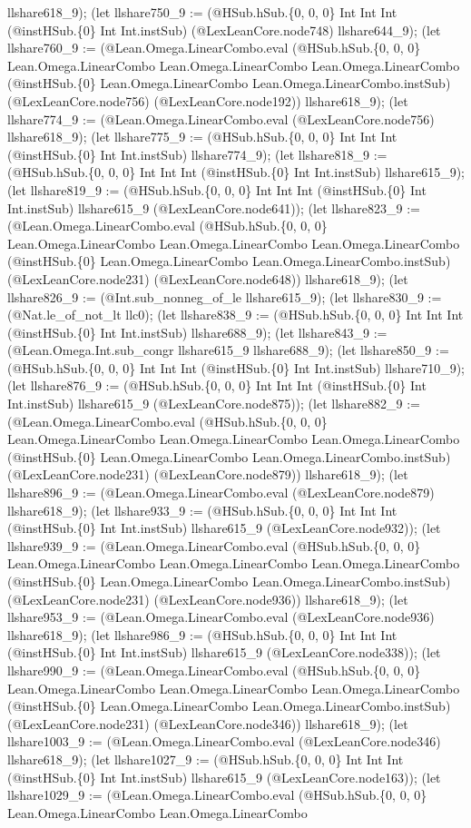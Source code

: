 \documentclass[11pt]{article}
\begin{document}
llshare618\_9); (let llshare750\_9 := (@HSub.hSub.\{0, 0, 0\} Int Int Int (@instHSub.\{0\} Int Int.instSub) (@LexLeanCore.node748) llshare644\_9); (let llshare760\_9 := (@Lean.Omega.LinearCombo.eval (@HSub.hSub.\{0, 0, 0\} Lean.Omega.LinearCombo Lean.Omega.LinearCombo Lean.Omega.LinearCombo (@instHSub.\{0\} Lean.Omega.LinearCombo Lean.Omega.LinearCombo.instSub) (@LexLeanCore.node756) (@LexLeanCore.node192)) llshare618\_9); (let llshare774\_9 := (@Lean.Omega.LinearCombo.eval (@LexLeanCore.node756) llshare618\_9); (let llshare775\_9 := (@HSub.hSub.\{0, 0, 0\} Int Int Int (@instHSub.\{0\} Int Int.instSub) llshare774\_9); (let llshare818\_9 := (@HSub.hSub.\{0, 0, 0\} Int Int Int (@instHSub.\{0\} Int Int.instSub) llshare615\_9); (let llshare819\_9 := (@HSub.hSub.\{0, 0, 0\} Int Int Int (@instHSub.\{0\} Int Int.instSub) llshare615\_9 (@LexLeanCore.node641)); (let llshare823\_9 := (@Lean.Omega.LinearCombo.eval (@HSub.hSub.\{0, 0, 0\} Lean.Omega.LinearCombo Lean.Omega.LinearCombo Lean.Omega.LinearCombo (@instHSub.\{0\} Lean.Omega.LinearCombo Lean.Omega.LinearCombo.instSub) (@LexLeanCore.node231) (@LexLeanCore.node648)) llshare618\_9); (let llshare826\_9 := (@Int.sub\_nonneg\_of\_le llshare615\_9); (let llshare830\_9 := (@Nat.le\_of\_not\_lt llc0); (let llshare838\_9 := (@HSub.hSub.\{0, 0, 0\} Int Int Int (@instHSub.\{0\} Int Int.instSub) llshare688\_9); (let llshare843\_9 := (@Lean.Omega.Int.sub\_congr llshare615\_9 llshare688\_9); (let llshare850\_9 := (@HSub.hSub.\{0, 0, 0\} Int Int Int (@instHSub.\{0\} Int Int.instSub) llshare710\_9); (let llshare876\_9 := (@HSub.hSub.\{0, 0, 0\} Int Int Int (@instHSub.\{0\} Int Int.instSub) llshare615\_9 (@LexLeanCore.node875)); (let llshare882\_9 := (@Lean.Omega.LinearCombo.eval (@HSub.hSub.\{0, 0, 0\} Lean.Omega.LinearCombo Lean.Omega.LinearCombo Lean.Omega.LinearCombo (@instHSub.\{0\} Lean.Omega.LinearCombo Lean.Omega.LinearCombo.instSub) (@LexLeanCore.node231) (@LexLeanCore.node879)) llshare618\_9); (let llshare896\_9 := (@Lean.Omega.LinearCombo.eval (@LexLeanCore.node879) llshare618\_9); (let llshare933\_9 := (@HSub.hSub.\{0, 0, 0\} Int Int Int (@instHSub.\{0\} Int Int.instSub) llshare615\_9 (@LexLeanCore.node932)); (let llshare939\_9 := (@Lean.Omega.LinearCombo.eval (@HSub.hSub.\{0, 0, 0\} Lean.Omega.LinearCombo Lean.Omega.LinearCombo Lean.Omega.LinearCombo (@instHSub.\{0\} Lean.Omega.LinearCombo Lean.Omega.LinearCombo.instSub) (@LexLeanCore.node231) (@LexLeanCore.node936)) llshare618\_9); (let llshare953\_9 := (@Lean.Omega.LinearCombo.eval (@LexLeanCore.node936) llshare618\_9); (let llshare986\_9 := (@HSub.hSub.\{0, 0, 0\} Int Int Int (@instHSub.\{0\} Int Int.instSub) llshare615\_9 (@LexLeanCore.node338)); (let llshare990\_9 := (@Lean.Omega.LinearCombo.eval (@HSub.hSub.\{0, 0, 0\} Lean.Omega.LinearCombo Lean.Omega.LinearCombo Lean.Omega.LinearCombo (@instHSub.\{0\} Lean.Omega.LinearCombo Lean.Omega.LinearCombo.instSub) (@LexLeanCore.node231) (@LexLeanCore.node346)) llshare618\_9); (let llshare1003\_9 := (@Lean.Omega.LinearCombo.eval (@LexLeanCore.node346) llshare618\_9); (let llshare1027\_9 := (@HSub.hSub.\{0, 0, 0\} Int Int Int (@instHSub.\{0\} Int Int.instSub) llshare615\_9 (@LexLeanCore.node163)); (let llshare1029\_9 := (@Lean.Omega.LinearCombo.eval (@HSub.hSub.\{0, 0, 0\} Lean.Omega.LinearCombo Lean.Omega.LinearCombo 
\end{document}
